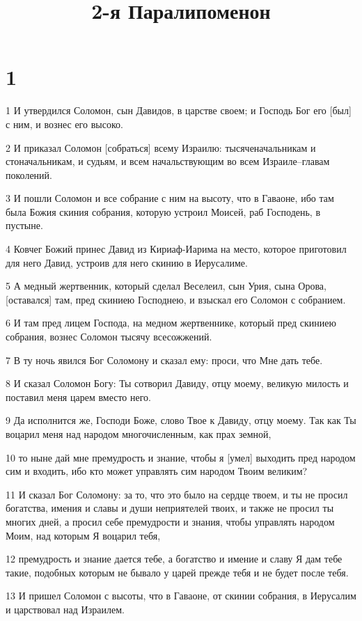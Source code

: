 

\title{2-я Паралипоменон}


\chapter{1}

\par 1 И утвердился Соломон, сын Давидов, в царстве своем; и Господь Бог его [был] с ним, и вознес его высоко.
\par 2 И приказал Соломон [собраться] всему Израилю: тысяченачальникам и стоначальникам, и судьям, и всем начальствующим во всем Израиле--главам поколений.
\par 3 И пошли Соломон и все собрание с ним на высоту, что в Гаваоне, ибо там была Божия скиния собрания, которую устроил Моисей, раб Господень, в пустыне.
\par 4 Ковчег Божий принес Давид из Кириаф-Иарима на место, которое приготовил для него Давид, устроив для него скинию в Иерусалиме.
\par 5 А медный жертвенник, который сделал Веселеил, сын Урия, сына Орова, [оставался] там, пред скиниею Господнею, и взыскал его Соломон с собранием.
\par 6 И там пред лицем Господа, на медном жертвеннике, который пред скиниею собрания, вознес Соломон тысячу всесожжений.
\par 7 В ту ночь явился Бог Соломону и сказал ему: проси, что Мне дать тебе.
\par 8 И сказал Соломон Богу: Ты сотворил Давиду, отцу моему, великую милость и поставил меня царем вместо него.
\par 9 Да исполнится же, Господи Боже, слово Твое к Давиду, отцу моему. Так как Ты воцарил меня над народом многочисленным, как прах земной,
\par 10 то ныне дай мне премудрость и знание, чтобы я [умел] выходить пред народом сим и входить, ибо кто может управлять сим народом Твоим великим?
\par 11 И сказал Бог Соломону: за то, что это было на сердце твоем, и ты не просил богатства, имения и славы и души неприятелей твоих, и также не просил ты многих дней, а просил себе премудрости и знания, чтобы управлять народом Моим, над которым Я воцарил тебя,
\par 12 премудрость и знание дается тебе, а богатство и имение и славу Я дам тебе такие, подобных которым не бывало у царей прежде тебя и не будет после тебя.
\par 13 И пришел Соломон с высоты, что в Гаваоне, от скинии собрания, в Иерусалим и царствовал над Израилем.
